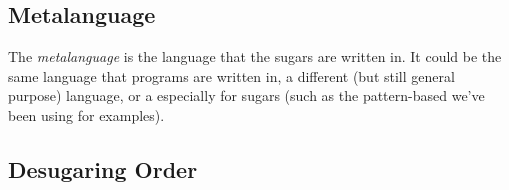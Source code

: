 \subsection{Metalanguage}

The \emph{metalanguage} is the language that the sugars are written
in. It could be the same language that programs are written in, a
different (but still general purpose) language, or a 
especially for sugars (such as the pattern-based
  we've been using for examples).


\subsection{Desugaring Order}

